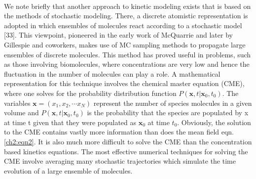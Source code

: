\paragraph{}
We note briefly that another approach to kinetic modeling exists that is based on
the methods of stochastic modeling. There, a discrete atomistic representation is
adopted in which ensembles of molecules react according to a stochastic model [33].
This viewpoint, pioneered in the early work of McQuarrie\cite{ch1_IRPC_34_mcquarrie1967stochastic} and later by Gillespie
and coworkers\cite{ch1_IRPC_35_gillespie1976general,ch1_IRPC_36_gillespie2013perspective,ch1_IRPC_37_gibson2000efficient}, makes use of MC sampling methods to propagate large ensembles
of discrete molecules. This method has proved useful in problems, such as those
involving biomolecules, where concentrations are very low and hence the fluctuation in
the number of molecules can play a role. A mathematical representation for this technique
involves the chemical master equation (CME), where one solves for the probability
distribution function $P\left( \mathbf{x},t\vert {\mathbf{x}}_0,t_0 \right)$. The variables $\mathbf{x} = (x_1,x_2,\cdots x_N)$ represent the
number of species molecules in a given volume and $P\left( \mathbf{x},t\vert {\mathbf{x}}_0,t_0 \right)$ is the probability that
the species are populated by x at time t given that they were populated as ${\mathbf{x}}_0$ at time $t_0$.
Obviously, the solution to the CME contains vastly more information than does the
mean field eqn. \ref{ch2:eqn2}. It is also much more difficult to solve the CME than the
concentration based kinetics equations. The most effective numerical techniques for
solving the CME involve averaging many stochastic trajectories which simulate the
time evolution of a large ensemble of molecules.
